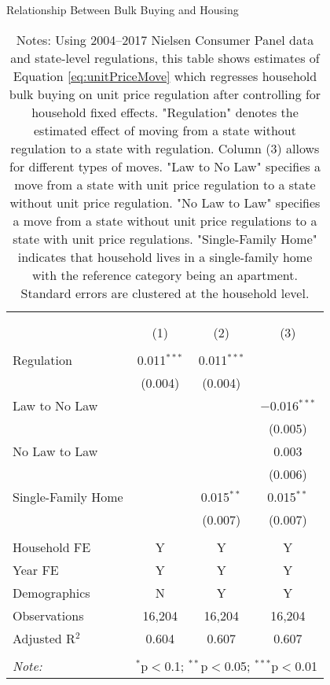 \begin{table}[!htbp] \centering
  \caption{Relationship Between Bulk Buying and Housing}
\begin{tabular}{@{\extracolsep{5pt}}lccc}
\\[-1.8ex]\hline
\hline \\[-1.8ex]
\\[-1.8ex] & (1) & (2) & (3)\\
\hline \\[-1.8ex]
 Regulation & 0.011$^{***}$ & 0.011$^{***}$ &  \\
  & (0.004) & (0.004) &  \\
  Law to No Law &  &  & $-$0.016$^{***}$ \\
  &  &  & (0.005) \\
  No Law to Law &  &  & 0.003 \\
  &  &  & (0.006) \\
  Single-Family Home &  & 0.015$^{**}$ & 0.015$^{**}$ \\
  &  & (0.007) & (0.007) \\
 \hline \\[-1.8ex]
Household FE & Y & Y & Y \\
Year FE & Y & Y & Y \\
Demographics & N & Y & Y \\
Observations & 16,204 & 16,204 & 16,204 \\
Adjusted R$^{2}$ & 0.604 & 0.607 & 0.607 \\
\hline
\hline \\[-1.8ex]
\textit{Note:}  & \multicolumn{3}{l}{$^{*}$p$<$0.1; $^{**}$p$<$0.05; $^{***}$p$<$0.01} \\
\end{tabular}
\caption*{Notes: Using 2004--2017 Nielsen Consumer Panel data and state-level regulations, this table shows estimates of Equation \ref{eq:unitPriceMove} which regresses household bulk buying on unit price regulation after controlling for household fixed effects. "Regulation" denotes the estimated effect of moving from a state without regulation to a state with regulation. Column (3) allows for different types of moves. "Law to No Law" specifies a move from a state with unit price regulation to a state without unit price regulation. "No Law to Law" specifies a move from a state without unit price regulations to a state with unit price regulations. "Single-Family Home" indicates that household lives in a single-family home with the reference category being an apartment. Standard errors are clustered at the household level.}
\end{table}
